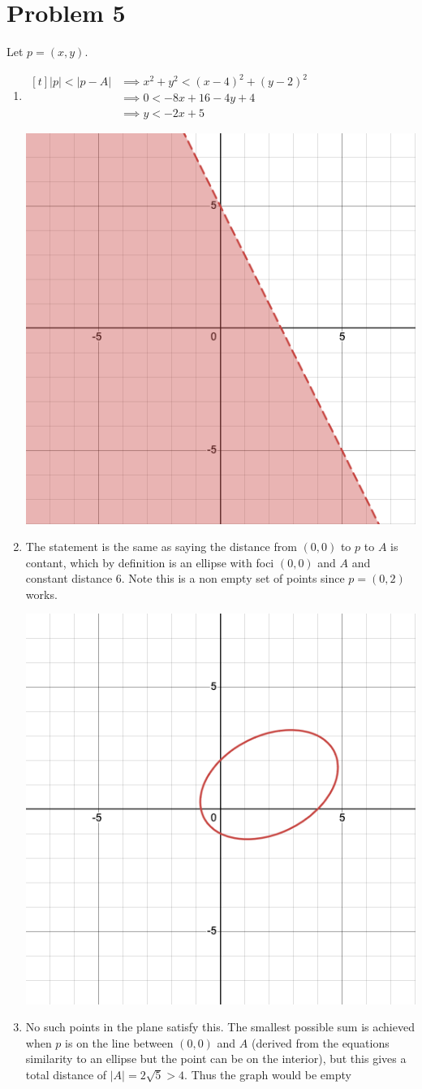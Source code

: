 \documentclass{eeleyes}
\begin{document}
\section*{Problem 5}
Let $p = (x,y)$.
\begin{enumerate}[label=\alph*)]
    \item $\begin{aligned}[t] 
            |p| < |p - A| &\implies x^2 + y^2 < (x - 4)^2 + (y - 2)^2  \\
                          &\implies 0 < -8x + 16 - 4y + 4 \\
                          &\implies y < -2x + 5
    \end{aligned}$

    \begin{center}
        \includegraphics[width=0.4\linewidth]{figures/problem5_a.png}
    \end{center}

    \item The statement is the same as saying the distance from $(0,0)$ to $p$ to $A$ is contant, which by definition is an ellipse with foci $(0,0)$ and $A$ and constant distance $6$. Note this is a non empty set of points since $p = (0,2)$ works.

    \begin{center}
        \includegraphics[width=0.4\linewidth]{figures/problem5_b.png}
    \end{center}

    \item No such points in the plane satisfy this. The smallest possible sum is achieved when $p$ is on the line between $(0,0)$ and $A$ (derived from the equations similarity to an ellipse but the point can be on the interior), but this gives a total distance of $|A| = 2 \sqrt{5} > 4$. Thus the graph would be empty


\end{enumerate}
\end{document}
